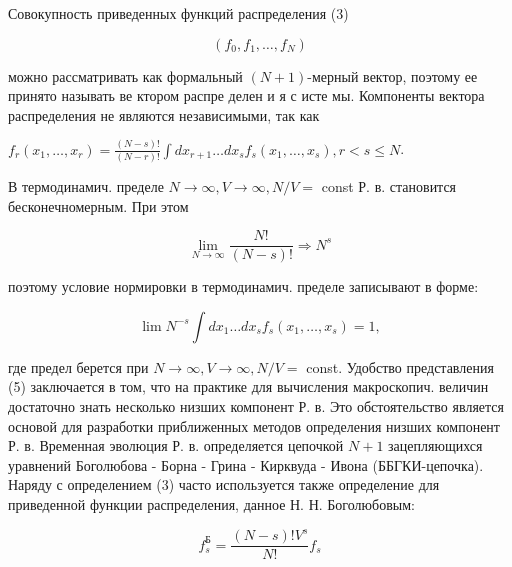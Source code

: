 \documentclass[10pt]{article}
\begin{document}
Совокупность приведенных функций распределения (3)



\[

\left(f_{0}, f_{1}, \ldots, f_{N}\right)

\]



можно рассматривать как формальный $(N+1)$-мерный вектор, поэтому ее принято называть ве ктором распре делен и я с исте мы. Компоненты вектора распределения не являются независимыми, так как



$f_{r}\left(x_{1}, \ldots, x_{r}\right)=\frac{(N-s) !}{(N-r) !} \int d x_{r+1} \ldots d x_{s} f_{s}\left(x_{1}, \ldots, x_{s}\right), r<s \leqslant N$.



В термодинамич. пределе $N \rightarrow \infty, V \rightarrow \infty, N / V=$ const Р. в. становится бесконечномерным. При этом



\[

\lim _{N \rightarrow \infty} \frac{N !}{(N-s) !} \Rightarrow N^{s}

\]



поэтому условие нормировки в термодинамич. пределе записывают в форме:



\[

\lim N^{-s} \int d x_{1} \ldots d x_{s} f_{s}\left(x_{1}, \ldots, x_{s}\right)=1,

\]



где предел берется при $N \rightarrow \infty, V \rightarrow \infty, N / V=$ const. Удобство представления (5) заключается в том, что на практике для вычисления макроскопич. величин достаточно знать несколько низших компонент Р. в. Это обстоятельство является основой для разработки приближенных методов определения низших компонент Р. в. Временная эволюция Р. в. определяется цепочкой $N+1$ зацепляющихся уравнений Боголюбова - Борна - Грина - Кирквуда - Ивона (ББГКИ-цепочка). Наряду с определением (3) часто используется также определение для приведенной функции распределения, данное Н. Н. Боголюбовым:



\[

f_{s}^{\mathrm{Б}}=\frac{(N-s) ! V^{s}}{N !} f_{s}

\]
\end{document}
